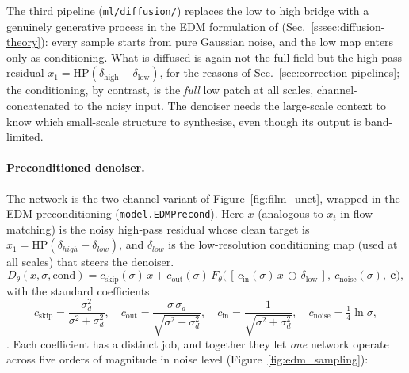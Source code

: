 \documentclass{report}
\begin{document}
The third pipeline (\texttt{ml/diffusion/}) replaces the low to high bridge with a genuinely generative process in the EDM formulation of \citeauthor{karras_elucidating_2022} (Sec.~\ref{sssec:diffusion-theory}): every sample starts from pure Gaussian noise, and the low map enters only as conditioning. What is diffused is again not the full field but the high-pass residual \mbox{$x_1 = \mathrm{HP}(\delta_{\mathrm{high}} - \delta_{\mathrm{low}})$}, for the reasons of Sec.~\ref{sec:correction-pipelines}; the conditioning, by contrast, is the \emph{full} low patch at all scales, channel-concatenated to the noisy input. The denoiser needs the large-scale context to know which small-scale structure to synthesise, even though its output is band-limited.

\paragraph{Preconditioned denoiser.} The network is the two-channel variant of Figure~\ref{fig:film_unet}, wrapped in the EDM preconditioning (\texttt{model.EDMPrecond}). Here $x$ (analogous to $x_t$ in flow matching) is the noisy high-pass residual whose clean target is $x_1 = \mathrm{HP}(\delta_{high}-\delta_{low})$, and $\delta_{low}$ is the low-resolution conditioning map (used at all scales) that steers the denoiser.
\begin{equation}
  D_\theta(x, \sigma, \mathrm{cond}) = c_{\mathrm{skip}}(\sigma)\,x
    + c_{\mathrm{out}}(\sigma)\, F_\theta\!\big(\,[\,c_{\mathrm{in}}(\sigma)\,x \,\oplus\, \delta_\mathrm{low}\,],\ c_{\mathrm{noise}}(\sigma),\ \mathbf{c}\big),
  \label{eq:edm_precond}
\end{equation}
with the standard coefficients
\begin{equation}
  c_{\mathrm{skip}} = \frac{\sigma_d^2}{\sigma^2 + \sigma_d^2}, \quad
  c_{\mathrm{out}} = \frac{\sigma\,\sigma_d}{\sqrt{\sigma^2 + \sigma_d^2}}, \quad
  c_{\mathrm{in}} = \frac{1}{\sqrt{\sigma^2 + \sigma_d^2}}, \quad
  c_{\mathrm{noise}} = \tfrac14 \ln \sigma,
  \label{eq:edm_coeffs}
\end{equation}
\cite{karras_elucidating_2022}. Each coefficient has a distinct job, and together they let \emph{one} network operate across five orders of magnitude in noise level (Figure~\ref{fig:edm_sampling}):
\end{document}
